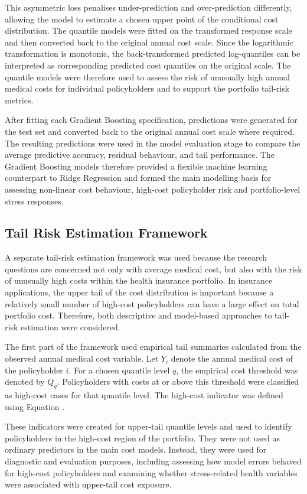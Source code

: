 	This asymmetric loss penalises under-prediction and over-prediction differently, allowing the model to estimate a chosen upper point of the conditional cost distribution. The quantile models were fitted on the transformed response scale and then converted back to the original annual cost scale. Since the logarithmic transformation is monotonic, the back-transformed predicted log-quantiles can be interpreted as corresponding predicted cost quantiles on the original scale. The quantile models were therefore used to assess the risk of unusually high annual medical costs for individual policyholders and to support the portfolio tail-risk metrics.
	
	After fitting each Gradient Boosting specification, predictions were generated for the test set and converted back to the original annual cost scale where required. The resulting predictions were used in the model evaluation stage to compare the average predictive accuracy, residual behaviour, and tail performance. The Gradient Boosting models therefore provided a flexible machine learning counterpart to Ridge Regression and formed the main modelling basis for assessing non-linear cost behaviour, high-cost policyholder risk and portfolio-level stress responses.
	
	\subsection{Tail Risk Estimation Framework}
	
	A separate tail-risk estimation framework was used because the research questions are concerned not only with average medical cost, but also with the risk of unusually high costs within the health insurance portfolio. In insurance applications, the upper tail of the cost distribution is important because a relatively small number of high-cost policyholders can have a large effect on total portfolio cost. Therefore, both descriptive and model-based approaches to tail-risk estimation were considered.
	
	The first part of the framework used empirical tail summaries calculated from the observed annual medical cost variable. Let \(Y_i\) denote the annual medical cost of the policyholder \(i\). For a chosen quantile level \(q\), the empirical cost threshold was denoted by \(Q_q\). Policyholders with costs at or above this threshold were classified as high-cost cases for that quantile level. The high-cost indicator was defined using Equation .
	
	These indicators were created for upper-tail quantile levels and used to identify policyholders in the high-cost region of the portfolio. They were not used as ordinary predictors in the main cost models. Instead, they were used for diagnostic and evaluation purposes, including assessing how model errors behaved for high-cost policyholders and examining whether stress-related health variables were associated with upper-tail cost exposure.
	
